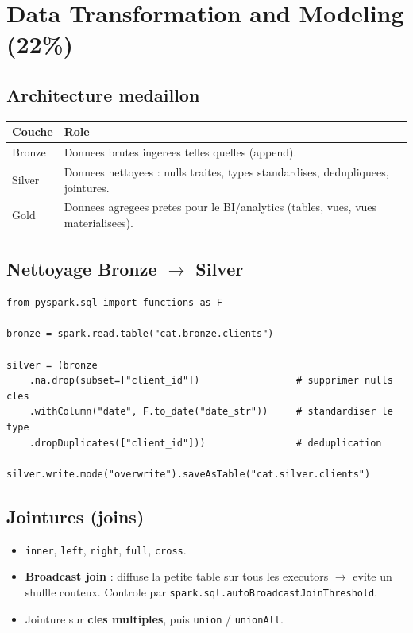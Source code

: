 \documentclass[11pt,a4paper]{article}
\begin{document}
\section{Data Transformation and Modeling (22\%)}

\subsection{Architecture medaillon}

\begin{center}
\renewcommand{\arraystretch}{1.3}
\begin{tabular}{@{}p{2.5cm}p{12cm}@{}}
\toprule
\textbf{Couche} & \textbf{Role} \\
\midrule
Bronze & Donnees brutes ingerees telles quelles (append). \\
Silver & Donnees nettoyees : nulls traites, types standardises, dedupliquees, jointures. \\
Gold & Donnees agregees pretes pour le BI/analytics (tables, vues, vues materialisees). \\
\bottomrule
\end{tabular}
\end{center}

\subsection{Nettoyage Bronze $\rightarrow$ Silver}

\begin{lstlisting}[style=pystyle,caption={Lire bronze, nettoyer, ecrire silver}]
from pyspark.sql import functions as F

bronze = spark.read.table("cat.bronze.clients")

silver = (bronze
    .na.drop(subset=["client_id"])                 # supprimer nulls cles
    .withColumn("date", F.to_date("date_str"))     # standardiser le type
    .dropDuplicates(["client_id"]))                # deduplication

silver.write.mode("overwrite").saveAsTable("cat.silver.clients")
\end{lstlisting}

\subsection{Jointures (joins)}

\begin{itemize}[leftmargin=*,nosep]
  \item \texttt{inner}, \texttt{left}, \texttt{right}, \texttt{full}, \texttt{cross}.
  \item \textbf{Broadcast join} : diffuse la petite table sur tous les executors $\rightarrow$
  evite un shuffle couteux. Controle par \texttt{spark.sql.autoBroadcastJoinThreshold}.
  \item Jointure sur \textbf{cles multiples}, puis \texttt{union} / \texttt{unionAll}.
\end{itemize}
\end{document}
